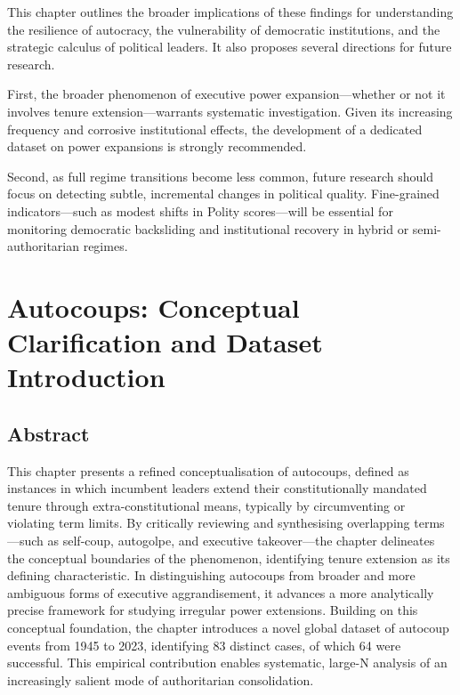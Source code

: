 \documentclass[
  12pt,
]{report}
\begin{document}
This chapter outlines the broader implications of these findings for
understanding the resilience of autocracy, the vulnerability of
democratic institutions, and the strategic calculus of political
leaders. It also proposes several directions for future research.

First, the broader phenomenon of executive power expansion---whether or
not it involves tenure extension---warrants systematic investigation.
Given its increasing frequency and corrosive institutional effects, the
development of a dedicated dataset on power expansions is strongly
recommended.

Second, as full regime transitions become less common, future research
should focus on detecting subtle, incremental changes in political
quality. Fine-grained indicators---such as modest shifts in Polity
scores---will be essential for monitoring democratic backsliding and
institutional recovery in hybrid or semi-authoritarian regimes.

\chapter{Autocoups: Conceptual Clarification and Dataset
Introduction}\label{sec-chapter3}

\section*{Abstract}\label{abstract-1}

This chapter presents a refined conceptualisation of autocoups, defined
as instances in which incumbent leaders extend their constitutionally
mandated tenure through extra-constitutional means, typically by
circumventing or violating term limits. By critically reviewing and
synthesising overlapping terms---such as self-coup, autogolpe, and
executive takeover---the chapter delineates the conceptual boundaries of
the phenomenon, identifying tenure extension as its defining
characteristic. In distinguishing autocoups from broader and more
ambiguous forms of executive aggrandisement, it advances a more
analytically precise framework for studying irregular power extensions.
Building on this conceptual foundation, the chapter introduces a novel
global dataset of autocoup events from 1945 to 2023, identifying 83
distinct cases, of which 64 were successful. This empirical contribution
enables systematic, large-N analysis of an increasingly salient mode of
authoritarian consolidation.
\end{document}
